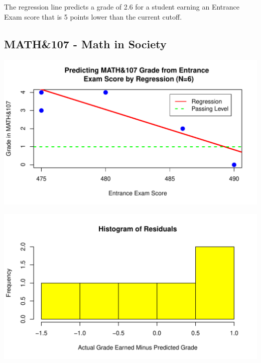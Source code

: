 \documentclass[twoside]{article}\usepackage[]{graphicx}\usepackage[]{color}
\makeatletter
\def\maxwidth{ %
  \ifdim\Gin@nat@width>\linewidth
    \linewidth
  \else
    \Gin@nat@width
  \fi
}
\newenvironment{knitrout}{}{} %
\makeatother
\begin{document}
The regression line predicts a grade of 2.6 for a student earning an Entrance Exam score that is 5 points lower than the current cutoff.


\newpage
\subsection{MATH\&107 - Math in Society}



\begin{knitrout}
\color{fgcolor}
\includegraphics[width=\maxwidth]{figure/107regressiongraph-1} 

\end{knitrout}

\begin{knitrout}
\color{fgcolor}
\includegraphics[width=\maxwidth]{figure/107residualsplot-1} 

\end{knitrout}
\end{document}
